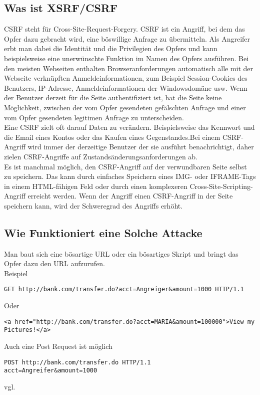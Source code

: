 {\subsection{Was ist XSRF/CSRF}
\label{sec:xsrf_what}
CSRF steht für Cross-Site-Request-Forgery. CSRF ist ein Angriff, bei dem das Opfer dazu gebracht wird, eine böswillige Anfrage zu übermitteln. Als Angreifer erbt man dabei die Identität und die Privilegien des Opfers und kann beispielsweise eine unerwünschte Funktion im Namen des Opfers ausführen. Bei den meisten Webseiten enthalten Browseranforderungen automatisch alle mit der Webseite verknüpften Anmeldeinformationen, zum Beispiel Session-Cookies des Benutzers, IP-Adresse, Anmeldeinformationen der Windowsdomäne usw. Wenn der Benutzer derzeit für die Seite authentifiziert ist, hat die Seite keine Möglichkeit, zwischen der vom Opfer gesendeten gefälschten Anfrage und einer vom Opfer gesendeten legitimen Anfrage zu unterscheiden.
\\
Eine CSRF zielt oft darauf Daten zu verändern. Beispielsweise das Kennwort und die Email eines Kontos oder das Kaufen eines Gegenstandes.Bei einem CSRF-Angriff wird immer der derzeitige Benutzer der sie ausführt benachrichtigt, daher zielen CSRF-Angriffe auf Zustandsänderungsanforderungen ab.
\\
Es ist manchmal möglich, den CSRF-Angriff auf der verwundbaren Seite selbst zu speichern. Das kann durch einfaches Speichern eines IMG- oder IFRAME-Tags in einem HTML-fähigen Feld oder durch einen komplexeren Cross-Site-Scripting-Angriff erreicht werden. Wenn der Angriff einen CSRF-Angriff in der Seite speichern kann, wird der Schweregrad des Angriffs erhöht. 
\subsection{Wie Funktioniert eine Solche Attacke}
\label{sec:xsrf_how}
Man baut sich eine bösartige URL oder ein bösartiges Skript und bringt das Opfer dazu den URL aufzurufen. 
\\
Beispiel
\begin{lstlisting}
GET http://bank.com/transfer.do?acct=Angreiger&amount=1000 HTTP/1.1
\end{lstlisting}
Oder
\begin{lstlisting}
<a href="http://bank.com/transfer.do?acct=MARIA&amount=100000">View my Pictures!</a>
\end{lstlisting}
Auch eine Post Request ist möglich
\\
\begin{lstlisting}
POST http://bank.com/transfer.do HTTP/1.1
acct=Angreifer&amount=1000
\end{lstlisting}
vgl. \textcite{CSRF}
}
